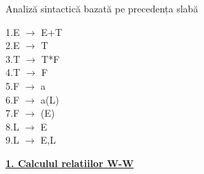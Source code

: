 \documentclass[pdf]{beamer}
\begin{document}
\begin{frame}{Analiză sintactică bazată pe precedența slabă}
\tiny
\begin{minipage}{0.30\textwidth}
    
    \color{black}
1.E $\rightarrow$ E+T \\
2.E $\rightarrow$ T \\
3.T $\rightarrow$ T*F \\
4.T $\rightarrow$ F \\
5.F $\rightarrow$ a \\
6.F $\rightarrow$ a(L) \\
7.F $\rightarrow$ (E) \\
8.L $\rightarrow$ E \\
9.L $\rightarrow$ E,L \\
    
\end{minipage}%

\hfill

\begin{minipage}{0.65\textwidth}
\setlength{\tabcolsep}{10pt}
\color{red}\underline{\textbf{1. Calculul relatiilor W-W}}\\
\color{black}
\begin{tabular}{p{3cm} p{3cm}}
\tiny
    &\\
    \hline
    \hline

    \hline

    \hline


\end{tabular}
\end{minipage}
\end{frame}
\end{document}
